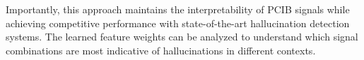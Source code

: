 Importantly, this approach maintains the interpretability of PCIB signals while achieving 
competitive performance with state-of-the-art hallucination detection systems. The learned 
feature weights can be analyzed to understand which signal combinations are most indicative 
of hallucinations in different contexts.